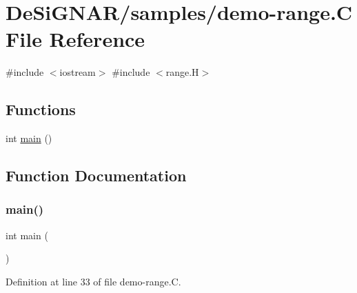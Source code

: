 \hypertarget{demo-range_8_c}{}\section{De\+Si\+G\+N\+A\+R/samples/demo-\/range.C File Reference}
\label{demo-range_8_c}
{\ttfamily \#include $<$iostream$>$}\newline
{\ttfamily \#include $<$range.\+H$>$}\newline
\subsection*{Functions}
\begin{DoxyCompactItemize}
\item 
int \hyperlink{demo-range_8_c_ae66f6b31b5ad750f1fe042a706a4e3d4}{main} ()
\end{DoxyCompactItemize}


\subsection{Function Documentation}
\mbox{\label{demo-range_8_c_ae66f6b31b5ad750f1fe042a706a4e3d4}} 
\subsubsection{\texorpdfstring{main()}{main()}}
{\footnotesize\ttfamily int main (\begin{DoxyParamCaption}{ }\end{DoxyParamCaption})}



Definition at line 33 of file demo-\/range.\+C.

